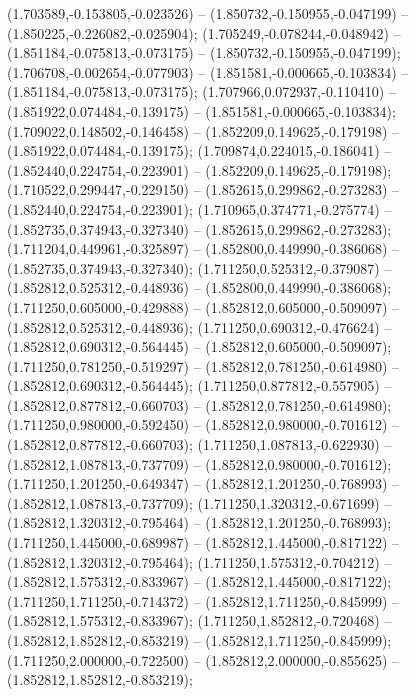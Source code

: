  (1.703589,-0.153805,-0.023526) -- (1.850732,-0.150955,-0.047199) -- (1.850225,-0.226082,-0.025904);
 (1.705249,-0.078244,-0.048942) -- (1.851184,-0.075813,-0.073175) -- (1.850732,-0.150955,-0.047199);
 (1.706708,-0.002654,-0.077903) -- (1.851581,-0.000665,-0.103834) -- (1.851184,-0.075813,-0.073175);
 (1.707966,0.072937,-0.110410) -- (1.851922,0.074484,-0.139175) -- (1.851581,-0.000665,-0.103834);
 (1.709022,0.148502,-0.146458) -- (1.852209,0.149625,-0.179198) -- (1.851922,0.074484,-0.139175);
 (1.709874,0.224015,-0.186041) -- (1.852440,0.224754,-0.223901) -- (1.852209,0.149625,-0.179198);
 (1.710522,0.299447,-0.229150) -- (1.852615,0.299862,-0.273283) -- (1.852440,0.224754,-0.223901);
 (1.710965,0.374771,-0.275774) -- (1.852735,0.374943,-0.327340) -- (1.852615,0.299862,-0.273283);
 (1.711204,0.449961,-0.325897) -- (1.852800,0.449990,-0.386068) -- (1.852735,0.374943,-0.327340);
 (1.711250,0.525312,-0.379087) -- (1.852812,0.525312,-0.448936) -- (1.852800,0.449990,-0.386068);
 (1.711250,0.605000,-0.429888) -- (1.852812,0.605000,-0.509097) -- (1.852812,0.525312,-0.448936);
 (1.711250,0.690312,-0.476624) -- (1.852812,0.690312,-0.564445) -- (1.852812,0.605000,-0.509097);
 (1.711250,0.781250,-0.519297) -- (1.852812,0.781250,-0.614980) -- (1.852812,0.690312,-0.564445);
 (1.711250,0.877812,-0.557905) -- (1.852812,0.877812,-0.660703) -- (1.852812,0.781250,-0.614980);
 (1.711250,0.980000,-0.592450) -- (1.852812,0.980000,-0.701612) -- (1.852812,0.877812,-0.660703);
 (1.711250,1.087813,-0.622930) -- (1.852812,1.087813,-0.737709) -- (1.852812,0.980000,-0.701612);
 (1.711250,1.201250,-0.649347) -- (1.852812,1.201250,-0.768993) -- (1.852812,1.087813,-0.737709);
 (1.711250,1.320312,-0.671699) -- (1.852812,1.320312,-0.795464) -- (1.852812,1.201250,-0.768993);
 (1.711250,1.445000,-0.689987) -- (1.852812,1.445000,-0.817122) -- (1.852812,1.320312,-0.795464);
 (1.711250,1.575312,-0.704212) -- (1.852812,1.575312,-0.833967) -- (1.852812,1.445000,-0.817122);
 (1.711250,1.711250,-0.714372) -- (1.852812,1.711250,-0.845999) -- (1.852812,1.575312,-0.833967);
 (1.711250,1.852812,-0.720468) -- (1.852812,1.852812,-0.853219) -- (1.852812,1.711250,-0.845999);
 (1.711250,2.000000,-0.722500) -- (1.852812,2.000000,-0.855625) -- (1.852812,1.852812,-0.853219);
